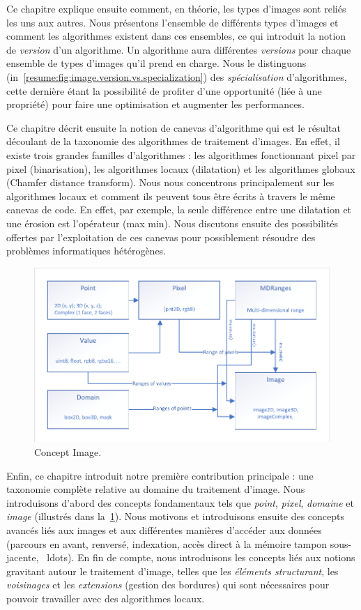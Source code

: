 Ce chapitre explique ensuite comment, en théorie, les types d'images sont reliés les uns aux autres. Nous présentons
l'ensemble de différents types d'images et comment les algorithmes existent dans ces ensembles, ce qui introduit la
notion de \emph{version} d'un algorithme. Un algorithme aura différentes \emph{versions} pour chaque ensemble de types
d'images qu'il prend en charge. Nous le distinguons (in~\cref{resume:fig:image.version.vs.specialization}) des
\emph{spécialisation} d'algorithmes, cette dernière étant la possibilité de profiter d'une opportunité (liée à une
propriété) pour faire une optimisation et augmenter les performances.

Ce chapitre décrit ensuite la notion de canevas d'algorithme qui est le résultat découlant de la taxonomie des
algorithmes de traitement d'images. En effet, il existe trois grandes familles d'algorithmes : les algorithmes
fonctionnant pixel par pixel (binarisation), les algorithmes locaux (dilatation) et les algorithmes globaux (Chamfer
distance transform). Nous nous concentrons principalement sur les algorithmes locaux et comment ils peuvent tous être
écrits à travers le même canevas de code. En effet, par exemple, la seule différence entre une dilatation et une érosion
est l'opérateur (max \vs min). Nous discutons ensuite des possibilités offertes par l'exploitation de ces canevas pour
possiblement résoudre des problèmes informatiques hétérogènes.

\begin{figure}[htbp]
  \centering
  \includegraphics[width=.8\linewidth]{../figures/concepts/image}
  \caption[]{Concept Image.}
  \label{resume:fig:concept.image}
\end{figure}

Enfin, ce chapitre introduit notre première contribution principale : une taxonomie complète relative au domaine du
traitement d'image. Nous introduisons d'abord des concepts fondamentaux tels que \emph{point}, \emph{pixel},
\emph{domaine} et \emph{image} (illustrés dans la~\cref{resume:fig:concept.image}). Nous motivons et introduisons
ensuite des concepts avancés liés aux images et aux différentes manières d'accéder aux données (parcours en avant,
renversé, indexation, accès direct à la mémoire tampon sous-jacente, \ ldots). En fin de compte, nous introduisons les
concepts liés aux notions gravitant autour le traitement d'image, telles que les \emph{éléments structurant}, les
\emph{voisinages} et les \emph{extensions} (gestion des bordures) qui sont nécessaires pour pouvoir travailler avec des
algorithmes locaux.

